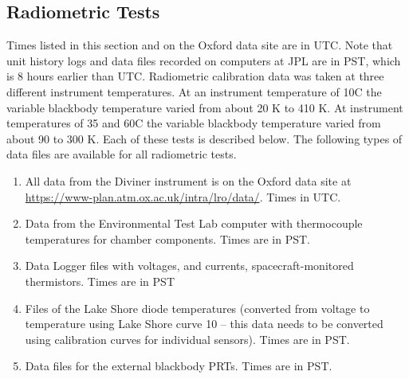 \subsection{Radiometric Tests}
Times listed in this section and on the Oxford data site are in UTC.
Note that unit history logs and data files recorded on computers at JPL are in PST, which is 8 hours earlier than UTC.
Radiometric calibration data was taken at three different instrument temperatures.
At an instrument temperature of 10\degree{}C the variable blackbody temperature varied from about 20 K to 410 K.
At instrument temperatures of 35 and 60\degree{}C the variable blackbody temperature varied from about 90 to 300 K.
Each of these tests is described below.
The following types of data files are available for all radiometric tests.

\begin{enumerate}
\item All data from the Diviner instrument is on the Oxford data site at \href{https://www-plan.atm.ox.ac.uk/intra/lro/data/}{https://www-plan.atm.ox.ac.uk/intra/lro/data/}. Times in UTC.
\item Data from the Environmental Test Lab computer with thermocouple temperatures for chamber components. Times are in PST.
\item Data Logger files with voltages, and currents, spacecraft-monitored thermistors. Times are in PST
\item Files of the Lake Shore diode temperatures (converted from voltage to temperature using Lake Shore curve 10 – this data needs to be converted using calibration curves for individual sensors). Times are in PST.
\item Data files for the external blackbody PRTs. Times are in PST.
\end{enumerate}



